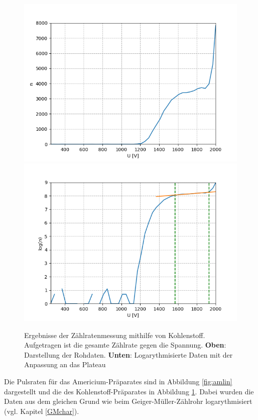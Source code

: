 \documentclass[12pt,a4paper]{article}
\begin{document}
\begin{figure}
\centering
\includegraphics[scale=0.8]{Bilder/Prop/C_lin.PNG}
\includegraphics[scale=0.8]{Bilder/Prop/C_log.PNG}
\caption{Ergebnisse der Zählratenmessung mithilfe von Kohlenstoff. Aufgetragen ist die gesamte Zählrate gegen die Spannung. \textbf{Oben}: Darstellung der Rohdaten. \textbf{Unten}: Logarythmisierte Daten mit der Anpassung an das Plateau}
\label{fig:clin}
\end{figure}

Die Pulsraten für das Americium-Präparates sind in Abbildung  \ref{fig:amlin} dargestellt und die des Kohlenstoff-Präparates in Abbildung \ref{fig:clin}. Dabei wurden die Daten aus dem gleichen Grund wie beim Geiger-Müller-Zählrohr logarythmisiert (vgl. Kapitel \ref{GMchar}).\\
\end{document}
